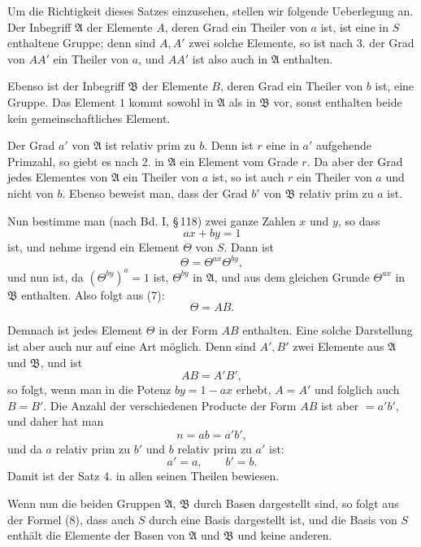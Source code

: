 \documentclass[11pt]{article}
\begin{document}
Um die Richtigkeit dieses Satzes einzusehen, stellen wir folgende Ueberlegung an. Der Inbegriff $\mathfrak A$ der Elemente $A$, deren Grad ein Theiler von $a$ ist, ist eine in $S$ enthaltene Gruppe; denn sind $A,A'$ zwei solche Elemente, so ist nach 3. der Grad von $AA'$ ein Theiler von $a$, und $AA'$ ist also auch in $\mathfrak A$ enthalten.

Ebenso ist der Inbegriff $\mathfrak B$ der Elemente $B$, deren Grad ein Theiler von $b$ ist, eine Gruppe. Das Element $1$ kommt sowohl in $\mathfrak A$ als in $\mathfrak B$ vor, sonst enthalten beide kein gemeinschaftliches Element.

Der Grad $a'$ von $\mathfrak A$ ist relativ prim zu $b$. Denn ist $r$ eine in $a'$ aufgehende Primzahl, so giebt es nach 2. in $\mathfrak A$ ein Element vom Grade $r$. Da aber der Grad jedes Elementes von $\mathfrak A$ ein Theiler von $a$ ist, so ist auch $r$ ein Theiler von $a$ und nicht von $b$. Ebenso beweist man, dass der Grad $b'$ von $\mathfrak B$ relativ prim zu $a$ ist.

Nun bestimme man (nach Bd. I, \S\,118) zwei ganze Zahlen $x$ und $y$, so dass
\begin{equation}
ax+by=1
\tag{6}
\end{equation}
ist, und nehme irgend ein Element $\Theta$ von $S$. Dann ist
\begin{equation}
\Theta=\Theta^{ax}\Theta^{by},
\tag{7}
\end{equation}
und nun ist, da $(\Theta^{by})^a=1$ ist, $\Theta^{by}$ in $\mathfrak A$, und aus dem gleichen Grunde $\Theta^{ax}$ in $\mathfrak B$ enthalten. Also folgt aus (7):
\begin{equation}
\Theta=AB.
\tag{8}
\end{equation}

Demnach ist jedes Element $\Theta$ in der Form $AB$ enthalten. Eine solche Darstellung ist aber auch nur auf eine Art möglich. Denn sind $A',B'$ zwei Elemente aus $\mathfrak A$ und $\mathfrak B$, und ist
\[
AB=A'B',
\]
so folgt, wenn man in die Potenz $by=1-ax$ erhebt, $A=A'$ und folglich auch $B=B'$. Die Anzahl der verschiedenen Producte der Form $AB$ ist aber $=a'b'$, und daher hat man
\[
n=ab=a'b',
\]
und da $a$ relativ prim zu $b'$ und $b$ relativ prim zu $a'$ ist:
\[
a'=a,
\qquad
b'=b.
\]
Damit ist der Satz 4. in allen seinen Theilen bewiesen.

Wenn nun die beiden Gruppen $\mathfrak A$, $\mathfrak B$ durch Basen dargestellt sind, so folgt aus der Formel (8), dass auch $S$ durch eine Basis dargestellt ist, und die Basis von $S$ enthält die Elemente der Basen von $\mathfrak A$ und $\mathfrak B$ und keine anderen.
\end{document}
